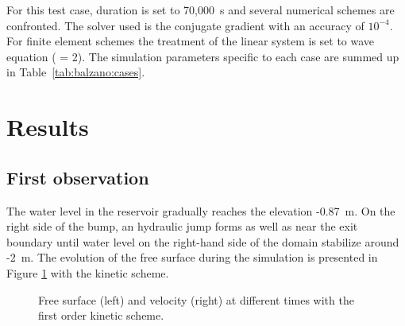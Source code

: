 For this test case, duration is set to 70,000~s and several numerical schemes
are confronted.
The solver used is the conjugate gradient with an accuracy of $10^{-4}$.
For finite element schemes the treatment of the linear system is set to wave
equation ( = 2).
The simulation parameters specific to each case are summed up in
Table~\ref{tab:balzano:cases}.
\begin{table}[H]
  \caption{List of the simulation parameters used for the five cases.}
  \label{tab:balzano:cases}
\end{table}

%
\section{Results}

\subsection{First observation}
\label{subsection:balzano:observations}

The water level in the reservoir gradually reaches the elevation -0.87~m.
On the right side of the bump,
an hydraulic jump forms as well as near the exit boundary until water level on
the right-hand side of the domain stabilize around -2~m.
The evolution of the free surface during the simulation is presented in Figure
\ref{fig:balzano:firstobs} with the kinetic scheme.

\begin{figure}[H]
\begin{minipage}[t]{0.5\textwidth}
 \centering
\end{minipage}%
\begin{minipage}[t]{0.5\textwidth}
 \centering
\end{minipage}
\caption{Free surface (left) and velocity (right) at different times with the first order kinetic scheme.}
  \label{fig:balzano:firstobs}
\end{figure}

